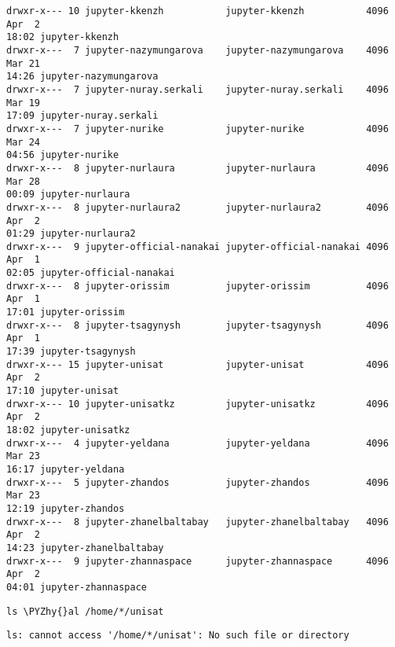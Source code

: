 \documentclass[11pt]{article}
\makeatletter
\def\PYZhy{\char`\-}
\newcommand{\boxspacing}{\kern\kvtcb@left@rule\kern\kvtcb@boxsep}
\newcommand{\prompt}[4]{
        \ttfamily\llap{{\color{#2}[#3]:\hspace{3pt}#4}}\vspace{-\baselineskip}
    }
\makeatother
\begin{document}
\begin{Verbatim}[commandchars=\\\{\}]
drwxr-x--- 10 jupyter-kkenzh           jupyter-kkenzh           4096 Apr  2
18:02 jupyter-kkenzh
drwxr-x---  7 jupyter-nazymungarova    jupyter-nazymungarova    4096 Mar 21
14:26 jupyter-nazymungarova
drwxr-x---  7 jupyter-nuray.serkali    jupyter-nuray.serkali    4096 Mar 19
17:09 jupyter-nuray.serkali
drwxr-x---  7 jupyter-nurike           jupyter-nurike           4096 Mar 24
04:56 jupyter-nurike
drwxr-x---  8 jupyter-nurlaura         jupyter-nurlaura         4096 Mar 28
00:09 jupyter-nurlaura
drwxr-x---  8 jupyter-nurlaura2        jupyter-nurlaura2        4096 Apr  2
01:29 jupyter-nurlaura2
drwxr-x---  9 jupyter-official-nanakai jupyter-official-nanakai 4096 Apr  1
02:05 jupyter-official-nanakai
drwxr-x---  8 jupyter-orissim          jupyter-orissim          4096 Apr  1
17:01 jupyter-orissim
drwxr-x---  8 jupyter-tsagynysh        jupyter-tsagynysh        4096 Apr  1
17:39 jupyter-tsagynysh
drwxr-x--- 15 jupyter-unisat           jupyter-unisat           4096 Apr  2
17:10 jupyter-unisat
drwxr-x--- 10 jupyter-unisatkz         jupyter-unisatkz         4096 Apr  2
18:02 jupyter-unisatkz
drwxr-x---  4 jupyter-yeldana          jupyter-yeldana          4096 Mar 23
16:17 jupyter-yeldana
drwxr-x---  5 jupyter-zhandos          jupyter-zhandos          4096 Mar 23
12:19 jupyter-zhandos
drwxr-x---  8 jupyter-zhanelbaltabay   jupyter-zhanelbaltabay   4096 Apr  2
14:23 jupyter-zhanelbaltabay
drwxr-x---  9 jupyter-zhannaspace      jupyter-zhannaspace      4096 Apr  2
04:01 jupyter-zhannaspace
    \end{Verbatim}

    \begin{tcolorbox}[breakable, size=fbox, boxrule=1pt, pad at break*=1mm,colback=cellbackground, colframe=cellborder]
\prompt{In}{incolor}{67}{\boxspacing}
\begin{Verbatim}[commandchars=\\\{\}]
ls \PYZhy{}al /home/*/unisat
\end{Verbatim}
\end{tcolorbox}

    \begin{Verbatim}[commandchars=\\\{\}]
ls: cannot access '/home/*/unisat': No such file or directory
    \end{Verbatim}

    \begin{Verbatim}[commandchars=\\\{\}]

    \end{Verbatim}
\end{document}
